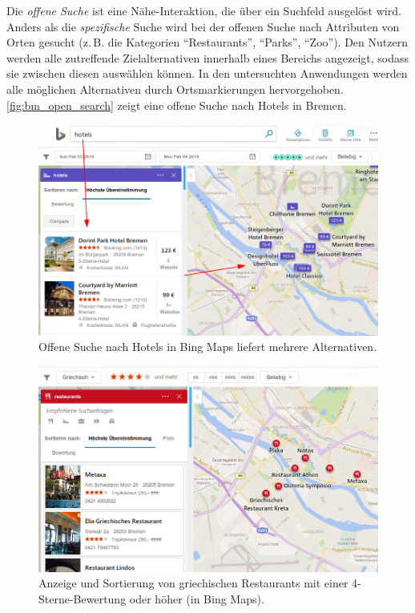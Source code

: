 Die \emph{offene Suche} ist eine Nähe-Interaktion, die über ein Suchfeld ausgelöst wird.
Anders als die \emph{spezifische} Suche wird bei der offenen Suche nach Attributen von Orten gesucht (z.\,B. die Kategorien \enquote{Restaurants}, \enquote{Parks}, \enquote{Zoo}).
Den Nutzern werden alle zutreffende Zielalternativen innerhalb eines Bereichs angezeigt, sodass sie zwischen diesen auswählen können.
In den untersuchten Anwendungen werden alle möglichen Alternativen durch Ortsmarkierungen hervorgehoben.
\autoref{fig:bm_open_search} zeigt eine offene Suche nach Hotels in Bremen.
\begin{figure}[p]
	\includegraphics[width=\linewidth]{figures/map-app_examples/bm_open_search_2}
	\caption{Offene Suche nach Hotels in Bing Maps liefert mehrere Alternativen.}
	\label{fig:bm_open_search}
\end{figure}
\begin{figure}[p]
    \includegraphics[trim={0cm, 2.5cm, 0cm, 0cm}, clip, width=\linewidth]{figures/map-app_examples/bm_filter_sorting}
    \caption{Anzeige und Sortierung von griechischen Restaurants mit einer 4-Sterne-Bewertung oder höher (in Bing Maps).}
    \label{fig:bm_sorting}
\end{figure}

